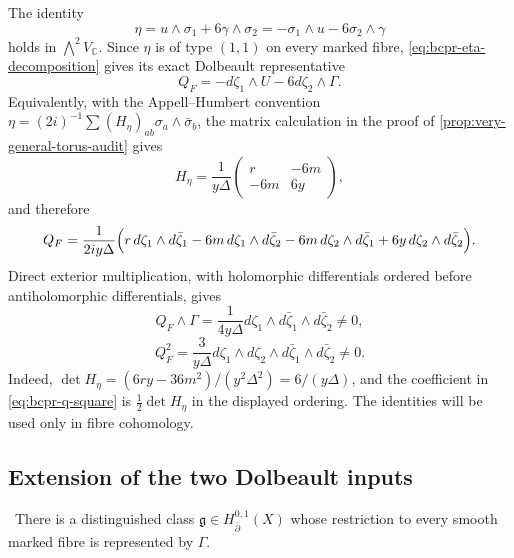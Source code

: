 The identity
\begin{equation}
 \eta=u\wedge\sigma_1+6\gamma\wedge\sigma_2
     =-\sigma_1\wedge u-6\sigma_2\wedge\gamma
\label{eq:bcpr-eta-decomposition}
\end{equation}
holds in $\bigwedge^2V_{\mathbb C}$.  Since $\eta$ is of type $(1,1)$
on every marked fibre, \cref{eq:bcpr-eta-decomposition} gives its exact
Dolbeault representative
\begin{equation}
 Q_F=-d\zeta_1\wedge U-6d\zeta_2\wedge\Gamma.
\label{eq:bcpr-q-fibre}
\end{equation}
Equivalently, with the Appell--Humbert convention
$\eta=(2i)^{-1}\sum(H_\eta)_{ab}\sigma_a\wedge\bar\sigma_b$, the matrix
calculation in the proof of \cref{prop:very-general-torus-audit} gives
\begin{equation}
 H_\eta=\frac1{y\Delta}
 \begin{pmatrix}r&-6m\\-6m&6y\end{pmatrix},
\label{eq:bcpr-appell-humbert-matrix}
\end{equation}
and therefore
\begin{equation}
 Q_F=\frac1{2iy\Delta}\Bigl(
 r\,d\zeta_1\wedge d\bar\zeta_1
 -6m\,d\zeta_1\wedge d\bar\zeta_2
 -6m\,d\zeta_2\wedge d\bar\zeta_1
 +6y\,d\zeta_2\wedge d\bar\zeta_2\Bigr).
\label{eq:bcpr-q-fibre-expanded}
\end{equation}
Direct exterior multiplication, with holomorphic differentials ordered
before antiholomorphic differentials, gives
\begin{equation}
 Q_F\wedge\Gamma
 =\frac1{4y\Delta}
 d\zeta_1\wedge d\bar\zeta_1\wedge d\bar\zeta_2\neq0,
\label{eq:bcpr-q-gamma-product}
\end{equation}
\begin{equation}
 Q_F^2
 =\frac3{y\Delta}
 d\zeta_1\wedge d\zeta_2\wedge
 d\bar\zeta_1\wedge d\bar\zeta_2\neq0.
\label{eq:bcpr-q-square}
\end{equation}
Indeed,
$\det H_\eta=(6ry-36m^2)/(y^2\Delta^2)=6/(y\Delta)$,
and the coefficient in \cref{eq:bcpr-q-square} is
$\tfrac12\det H_\eta$ in the displayed ordering.  The identities
 will be used only in
fibre cohomology.

\subsection{Extension of the two Dolbeault inputs}

\begin{lemma}
\label{lem:bcpr-degree-one-input}
\Verified\ There is a distinguished class
$\mathfrak g\in H^{0,1}_{\bar\partial}(X)$ whose restriction to every
smooth marked fibre is represented by $\Gamma$.
\end{lemma}

